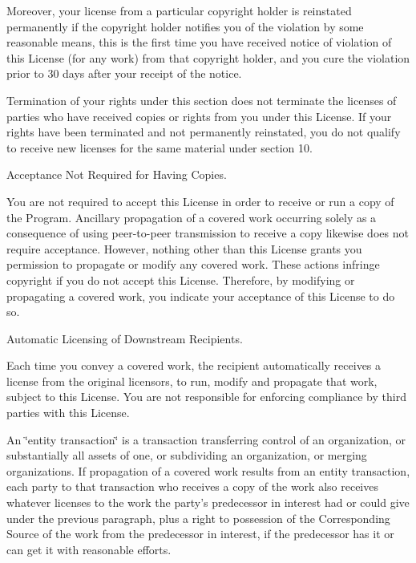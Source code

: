 Moreover, your license from a particular copyright holder is reinstated permanently if the copyright holder notifies you of the violation by some reasonable means, this is the first time you have received notice of violation of this License (for any work) from that copyright holder, and you cure the violation prior to 30 days after your receipt of the notice.

Termination of your rights under this section does not terminate the licenses of parties who have received copies or rights from you under this License. If your rights have been terminated and not permanently reinstated, you do not qualify to receive new licenses for the same material under section 10.


\begin{DoxyEnumerate}
\item Acceptance Not Required for Having Copies.
\end{DoxyEnumerate}

You are not required to accept this License in order to receive or run a copy of the Program. Ancillary propagation of a covered work occurring solely as a consequence of using peer-\/to-\/peer transmission to receive a copy likewise does not require acceptance. However, nothing other than this License grants you permission to propagate or modify any covered work. These actions infringe copyright if you do not accept this License. Therefore, by modifying or propagating a covered work, you indicate your acceptance of this License to do so.


\begin{DoxyEnumerate}
\item Automatic Licensing of Downstream Recipients.
\end{DoxyEnumerate}

Each time you convey a covered work, the recipient automatically receives a license from the original licensors, to run, modify and propagate that work, subject to this License. You are not responsible for enforcing compliance by third parties with this License.

An \char`\"{}entity transaction\char`\"{} is a transaction transferring control of an organization, or substantially all assets of one, or subdividing an organization, or merging organizations. If propagation of a covered work results from an entity transaction, each party to that transaction who receives a copy of the work also receives whatever licenses to the work the party's predecessor in interest had or could give under the previous paragraph, plus a right to possession of the Corresponding Source of the work from the predecessor in interest, if the predecessor has it or can get it with reasonable efforts.

